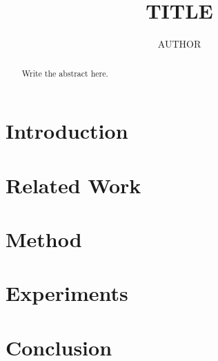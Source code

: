 \documentclass{article}
\title{{{TITLE}}}
\author{{{AUTHOR}}}
\begin{document}
\maketitle

\begin{abstract}
Write the abstract here.
\end{abstract}

\section{Introduction}

\section{Related Work}

\section{Method}

\section{Experiments}

\section{Conclusion}



\end{document}
